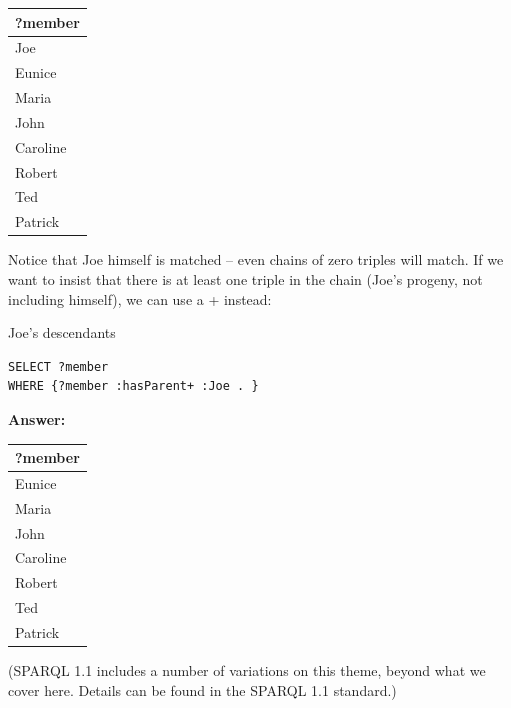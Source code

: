 \begin{tabular}{|l|}
\hline
?member\\
\hline
Joe\\
Eunice\\
Maria\\
John\\
Caroline\\
Robert\\
Ted\\
Patrick\\
\hline
\end{tabular}


Notice that Joe himself is matched -- even chains of zero triples will
match. If we want to insist that there is at least one triple in the
chain (Joe's progeny, not including himself), we can use a + instead:

\begin{query}Joe's descendants\end{query}

\begin{lstlisting}
SELECT ?member
WHERE {?member :hasParent+ :Joe . }
\end{lstlisting}

\textbf{\textbf{Answer:}}

\begin{tabular}{|l|}
\hline
?member\\
\hline
Eunice\\
Maria\\
John\\
Caroline\\
Robert\\
Ted\\
Patrick\\
\hline
\end{tabular}

(SPARQL 1.1 includes a number of variations on this theme, beyond what
we cover here. Details can be found in the SPARQL 1.1 standard.)

